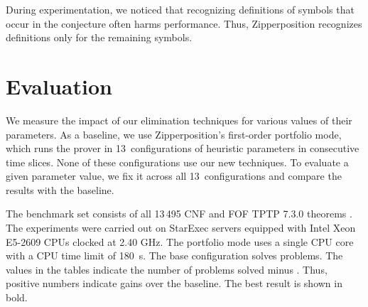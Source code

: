 During experimentation, we noticed that recognizing definitions of symbols that
occur in the conjecture often harms performance. Thus, Zipperposition
recognizes definitions only for the remaining symbols.

\section{Evaluation}
\label{sec:satfol:evaluation}


\newcommand{\baseres}[0]{7897}

\newcommand{\resnum}[1]{
   \FPeval{\result}{clip(#1-\baseres)}%
   \ifnumcomp{\result}{>}{0}{$+\result$}{$\result$}%
}
\newcommand{\resnumphantom}[1]{%
   \FPeval{\result}{clip(#1-\baseres)}%
   \FPeval{\negresult}{clip(-\result)}%
   \ifnumcomp{\result}{>}{0}{\phantom{$0$}{${+}\result$}}{\phantom{$0$}{${-}\negresult$}}%
}
\newcommand{\resnumbold}[1]{
   \FPeval{\result}{clip(#1-\baseres)}%
   \FPeval{\negresult}{clip(-\result)}%
   \ifnumcomp{\result}{>}{0}{\phantom{${+}\result$}\llap{$\mathbf{\boldsymbol{+}\result}$}}{\phantom{${-}\negresult$}$\llap{\mathbf{\boldsymbol{-}\negresult}}$}%
}
\newcommand{\resnumboldphantom}[1]{%
   \FPeval{\result}{clip(#1-\baseres)}%
   \FPeval{\negresult}{clip(-\result)}%
   \ifnumcomp{\result}{>}{0}{\phantom{$0{+}\result$}\llap{$\mathbf{\phantom{0}{\boldsymbol{+}}\result}$}}{\phantom{$0{-}\negresult$}$\llap{\mathbf{\phantom{0}{\boldsymbol{-}}\negresult}}$}%
}
\newcommand{\evaluating}[0]{\textbf{?}}

We measure the impact of our elimination techniques for various values of their
parameters. As a baseline, we use Zipperposition's first-order portfolio mode,
which runs the prover in 13~configurations of
heuristic parameters in consecutive time slices. None of these configurations
use our new techniques. To evaluate a given parameter value, we fix
it across all 13~configurations and compare the results with the baseline.

The benchmark set consists of all 13\,495 CNF and FOF TPTP 7.3.0 theorems
\cite{gs-17-tptp}.
%
The experiments were carried out on StarExec servers \cite{sst-14-starexec}
equipped with Intel Xeon E5-2609 CPUs clocked at 2.40 GHz. The portfolio mode
uses a single CPU core with a CPU time limit of 180~s. The base
configuration solves \NumberOK{\baseres} problems. The values in the tables
indicate the number of problems solved minus \NumberOK{\baseres}. Thus,
positive numbers indicate gains over the baseline. The best result is shown in
bold.

